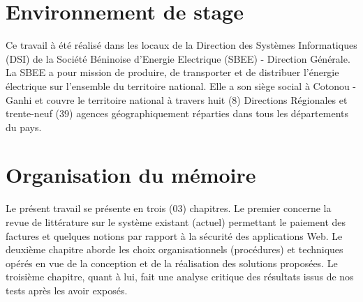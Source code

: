     \section{Environnement de stage}
      \small{
	Ce travail \`a \'et\'e r\'ealis\'e dans les locaux de la Direction des Syst\`emes Informatiques (DSI) de la Soci\'et\'e B\'eninoise d'Energie Electrique (SBEE) - Direction G\'en\'erale. La SBEE a pour mission de produire, de transporter et de distribuer l’énergie électrique sur l’ensemble du territoire national. Elle a son siège social à Cotonou - Ganhi et couvre le territoire national à travers  huit (8) Directions Régionales et trente-neuf (39) agences géographiquement réparties dans tous les départements du pays.
      }
      
    \section{Organisation du mémoire}
	\small{
	  Le présent travail se présente en trois (03) chapitres. Le premier concerne la revue de littérature sur le syst\`eme existant (actuel) permettant le paiement des factures et quelques notions par rapport \`a la s\'ecurit\'e des applications Web. Le deuxième chapitre aborde les choix organisationnels (proc\'edures) et techniques opérés en vue de la conception et de la réalisation des solutions proposées. Le troisième chapitre, quant à lui, fait une analyse critique des résultats issus de nos tests après les avoir exposés.
	}


